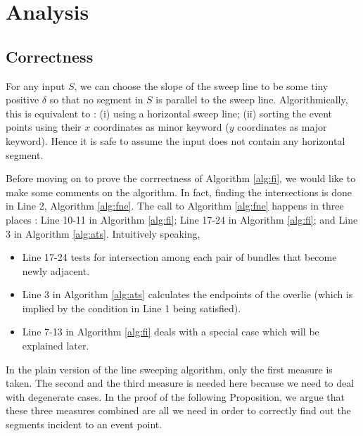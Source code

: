 \documentclass[a4paper]{article}
\begin{document}
\section{Analysis}

\subsection{Correctness}

For any input $S$,
we can choose the slope of the sweep line to be some tiny positive $\delta$
so that no segment in $S$ is parallel to the sweep line.
Algorithmically, this is equivalent to :
(i) using a horizontal sweep line; 
(ii) sorting the event points using their $x$ coordinates as minor keyword
($y$ coordinates as major keyword).
Hence it is safe to assume the input does not contain any horizontal segment.

Before moving on to prove the corrrectness of Algorithm \ref{alg:fi},
we would like to make some comments on the algorithm.
In fact, finding the intersections is done in Line 2, Algorithm \ref{alg:fne}.
The call to Algorithm \ref{alg:fne} happens in three places : 
Line 10-11 in Algorithm \ref{alg:fi}; 
Line 17-24 in Algorithm \ref{alg:fi}; 
and Line 3 in Algorithm \ref{alg:ats}. 
Intuitively speaking,
\begin{itemize}
\item Line 17-24 tests for intersection among each pair of bundles that become newly adjacent.
\item Line 3 in Algorithm \ref{alg:ats} calculates the endpoints of the overlie
  (which is implied by the condition in Line 1 being satisfied).
\item Line 7-13 in Algorithm \ref{alg:fi} deals with a special case
  which will be explained later.
\end{itemize}
In the plain version of the line sweeping algorithm, only the first measure is taken.
The second and the third measure is needed here because we need to deal with degenerate cases.
In the proof of the following Proposition, we argue that these three measures combined
are all we need in order to correctly find out the segments incident to an event point.
\end{document}
